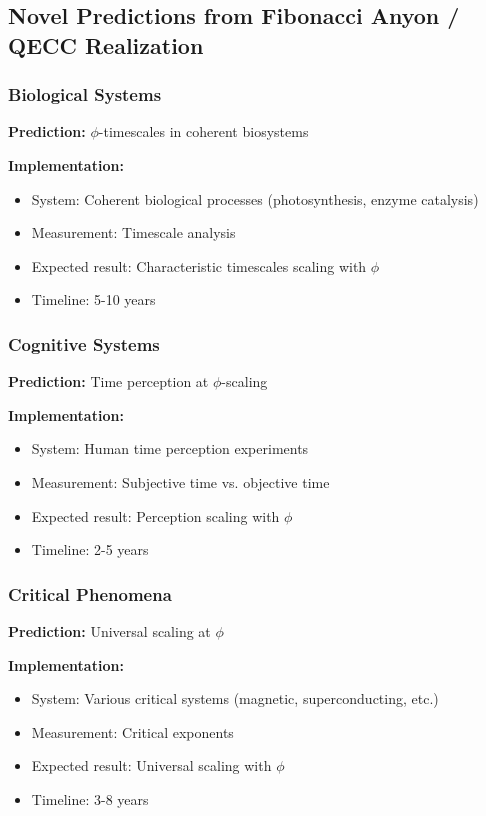 \documentclass[11pt]{article}
\theoremstyle{definition}
\newcommand{\goldenratio}{\phi}
\begin{document}
\subsection{Novel Predictions from Fibonacci Anyon / QECC Realization}

\subsubsection{Biological Systems}

\textbf{Prediction:} $\goldenratio$-timescales in coherent biosystems

\textbf{Implementation:}
\begin{itemize}
\item System: Coherent biological processes (photosynthesis, enzyme catalysis)
\item Measurement: Timescale analysis
\item Expected result: Characteristic timescales scaling with $\goldenratio$
\item Timeline: 5-10 years
\end{itemize}

\subsubsection{Cognitive Systems}

\textbf{Prediction:} Time perception at $\goldenratio$-scaling

\textbf{Implementation:}
\begin{itemize}
\item System: Human time perception experiments
\item Measurement: Subjective time vs. objective time
\item Expected result: Perception scaling with $\goldenratio$
\item Timeline: 2-5 years
\end{itemize}

\subsubsection{Critical Phenomena}

\textbf{Prediction:} Universal scaling at $\goldenratio$

\textbf{Implementation:}
\begin{itemize}
\item System: Various critical systems (magnetic, superconducting, etc.)
\item Measurement: Critical exponents
\item Expected result: Universal scaling with $\goldenratio$
\item Timeline: 3-8 years
\end{itemize}
\end{document}
